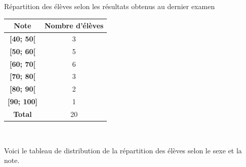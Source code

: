 \documentclass[answers, addpoints, 12pt,fleqn]{exam}
\theoremstyle{definition}       %
\begin{document}
\begin{questions}
\begin{solution}
\begin{parts}
\begin{center}
Répartition des élèves selon les résultats obtenus au dernier examen
\vspace{0.2cm}
\begin{tabular}{|c|c|}
\hline
\textbf{Note} &\textbf{Nombre d'élèves}  \\ \hline
\textbf{[40; 50[} &3 \\ \hline
\textbf{[50; 60[} &5 \\ \hline
\textbf{[60; 70[} &6 \\ \hline
\textbf{[70; 80[} &3 \\ \hline
\textbf{[80; 90[} &2 \\ \hline
\textbf{[90; 100]}&1 \\ \hline
\textbf{Total} &20 \\ \hline
\end{tabular} \\
\end{center}
\end{parts}
\end{solution}

\bigskip

\question Voici le tableau de distribution de la répartition des élèves selon le sexe et la note.


\end{questions}
\end{document}
